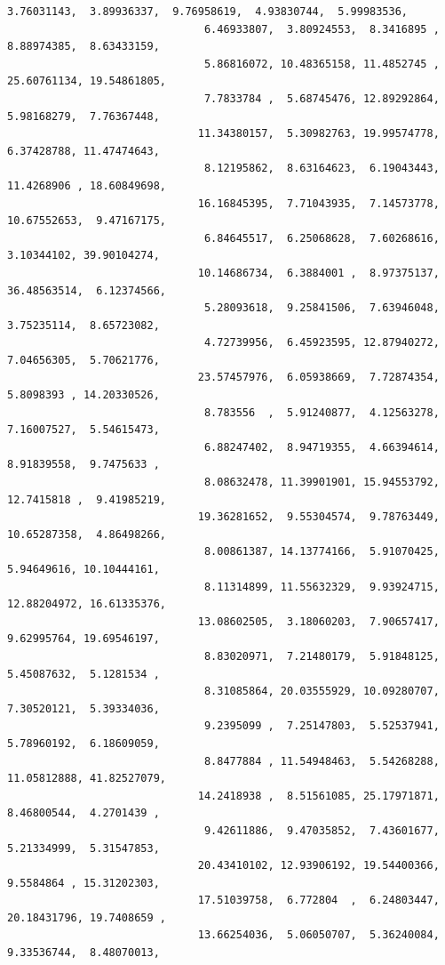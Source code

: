\documentclass[11pt]{article}
\begin{document}
\begin{Verbatim}[commandchars=\\\{\}]
                               3.76031143,  3.89936337,  9.76958619,  4.93830744,  5.99983536,
                               6.46933807,  3.80924553,  8.3416895 ,  8.88974385,  8.63433159,
                               5.86816072, 10.48365158, 11.4852745 , 25.60761134, 19.54861805,
                               7.7833784 ,  5.68745476, 12.89292864,  5.98168279,  7.76367448,
                              11.34380157,  5.30982763, 19.99574778,  6.37428788, 11.47474643,
                               8.12195862,  8.63164623,  6.19043443, 11.4268906 , 18.60849698,
                              16.16845395,  7.71043935,  7.14573778, 10.67552653,  9.47167175,
                               6.84645517,  6.25068628,  7.60268616,  3.10344102, 39.90104274,
                              10.14686734,  6.3884001 ,  8.97375137, 36.48563514,  6.12374566,
                               5.28093618,  9.25841506,  7.63946048,  3.75235114,  8.65723082,
                               4.72739956,  6.45923595, 12.87940272,  7.04656305,  5.70621776,
                              23.57457976,  6.05938669,  7.72874354,  5.8098393 , 14.20330526,
                               8.783556  ,  5.91240877,  4.12563278,  7.16007527,  5.54615473,
                               6.88247402,  8.94719355,  4.66394614,  8.91839558,  9.7475633 ,
                               8.08632478, 11.39901901, 15.94553792, 12.7415818 ,  9.41985219,
                              19.36281652,  9.55304574,  9.78763449, 10.65287358,  4.86498266,
                               8.00861387, 14.13774166,  5.91070425,  5.94649616, 10.10444161,
                               8.11314899, 11.55632329,  9.93924715, 12.88204972, 16.61335376,
                              13.08602505,  3.18060203,  7.90657417,  9.62995764, 19.69546197,
                               8.83020971,  7.21480179,  5.91848125,  5.45087632,  5.1281534 ,
                               8.31085864, 20.03555929, 10.09280707,  7.30520121,  5.39334036,
                               9.2395099 ,  7.25147803,  5.52537941,  5.78960192,  6.18609059,
                               8.8477884 , 11.54948463,  5.54268288, 11.05812888, 41.82527079,
                              14.2418938 ,  8.51561085, 25.17971871,  8.46800544,  4.2701439 ,
                               9.42611886,  9.47035852,  7.43601677,  5.21334999,  5.31547853,
                              20.43410102, 12.93906192, 19.54400366,  9.5584864 , 15.31202303,
                              17.51039758,  6.772804  ,  6.24803447, 20.18431796, 19.7408659 ,
                              13.66254036,  5.06050707,  5.36240084,  9.33536744,  8.48070013,

\end{Verbatim}
\end{document}
